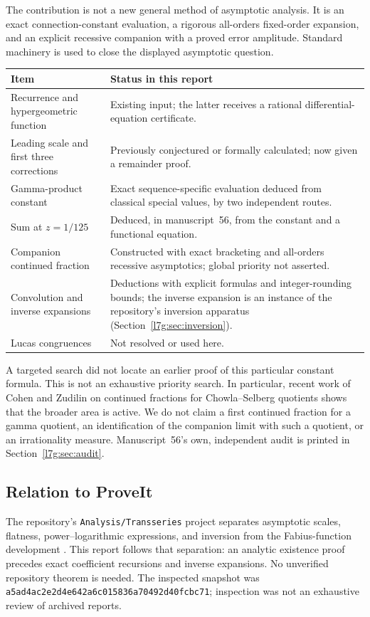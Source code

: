 \documentclass[11pt,letterpaper]{article}
\newcommand{\file}[1]{\nolinkurl{#1}}
\theoremstyle{remark}\newtheorem{remark}[theorem]{Remark}
\newcounter{l7gtrsavedeq}
\begin{document}
The contribution is not a new general method of asymptotic analysis.
It is an exact connection-constant evaluation, a rigorous all-orders
fixed-order expansion, and an explicit recessive companion with a proved
error amplitude. Standard machinery is used to close the displayed
asymptotic question.
\begin{center}
\begin{tabular}{p{}p{}}
\toprule
Item & Status in this report\\\midrule
Recurrence and hypergeometric function & Existing input; the latter
receives a rational differential-equation certificate.\\
Leading scale and first three corrections & Previously conjectured or
formally calculated; now given a remainder proof.\\
Gamma-product constant & Exact sequence-specific evaluation deduced
from classical special values, by two independent routes.\\
Sum at $z=1/125$ & Deduced, in manuscript~56, from the constant and a
functional equation.\\
Companion continued fraction & Constructed with exact bracketing and
all-orders recessive asymptotics; global priority not asserted.\\
Convolution and inverse expansions & Deductions with explicit formulas
and integer-rounding bounds; the inverse expansion is an instance of the
repository's inversion apparatus (Section~\ref{l7g:sec:inversion}).\\
Lucas congruences & Not resolved or used here.\\\bottomrule
\end{tabular}
\end{center}
A targeted search did not locate an earlier proof of this particular
constant formula. This is not an exhaustive priority search. In
particular, recent work of Cohen and Zudilin on continued fractions for
Chowla--Selberg quotients \cite{l7g:cohenzudilin} shows that the broader area
is active. We do not claim a first continued fraction for a gamma
quotient, an identification of the companion limit with such a quotient,
or an irrationality measure. Manuscript~56's own, independent audit is
printed in Section~\ref{l7g:sec:audit}.

\subsection{Relation to ProveIt}
The repository's \file{Analysis/Transseries} project separates
asymptotic scales, flatness, power--logarithmic expressions, and inversion
from the Fabius-function development \cite{l7g:proveit}. This report follows
that separation: an analytic existence proof precedes exact coefficient
recursions and inverse expansions. No unverified repository theorem is
needed. The inspected snapshot was
\texttt{a5ad4ac2e2d4e642a6c015836a70492d40fcbc71}; inspection was not an
exhaustive review of archived reports.
\end{document}
